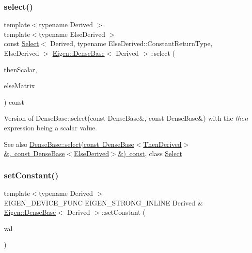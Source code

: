 \subsubsection{\texorpdfstring{select()}{select()}\hspace{0.1cm}{\footnotesize\ttfamily [3/3]}}
{\footnotesize\ttfamily template$<$typename Derived $>$ \\
template$<$typename Else\+Derived $>$ \\
const \mbox{\hyperlink{class_eigen_1_1_select}{Select}}$<$ Derived, typename Else\+Derived\+::\+Constant\+Return\+Type, Else\+Derived $>$ \mbox{\hyperlink{class_eigen_1_1_dense_base}{Eigen\+::\+Dense\+Base}}$<$ Derived $>$\+::select (\begin{DoxyParamCaption}\item[{const typename Else\+Derived\+::\+Scalar \&}]{then\+Scalar,  }\item[{const \mbox{\hyperlink{class_eigen_1_1_dense_base}{Dense\+Base}}$<$ Else\+Derived $>$ \&}]{else\+Matrix }\end{DoxyParamCaption}) const\hspace{0.3cm}{\ttfamily [inline]}}

Version of Dense\+Base\+::select(const Dense\+Base\&, const Dense\+Base\&) with the {\itshape then} expression being a scalar value.

\begin{DoxySeeAlso}{See also}
\mbox{\hyperlink{class_eigen_1_1_dense_base_a65e78cfcbc9852e6923bebff4323ddca}{Dense\+Base\+::select(const Dense\+Base$<$\+Then\+Derived$>$\&, const Dense\+Base$<$\+Else\+Derived$>$\&) const}}, class \mbox{\hyperlink{class_eigen_1_1_select}{Select}} 
\end{DoxySeeAlso}
\mbox{\label{class_eigen_1_1_dense_base_a19b2bc788277e9ab3f967a8857e290ae}} 
\subsubsection{\texorpdfstring{setConstant()}{setConstant()}}
{\footnotesize\ttfamily template$<$typename Derived $>$ \\
E\+I\+G\+E\+N\+\_\+\+D\+E\+V\+I\+C\+E\+\_\+\+F\+U\+NC E\+I\+G\+E\+N\+\_\+\+S\+T\+R\+O\+N\+G\+\_\+\+I\+N\+L\+I\+NE Derived \& \mbox{\hyperlink{class_eigen_1_1_dense_base}{Eigen\+::\+Dense\+Base}}$<$ Derived $>$\+::set\+Constant (\begin{DoxyParamCaption}\item[{const \mbox{\hyperlink{class_eigen_1_1_dense_base_a5feed465b3a8e60c47e73ecce83e39a2}{Scalar}} \&}]{val }\end{DoxyParamCaption})}

